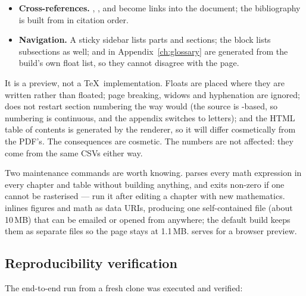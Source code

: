 \begin{itemize}
     with .
  \item \textbf{Cross-references.} ,
    ,  and
     become links into the document; the bibliography is built
    from  in citation order.
  \item \textbf{Navigation.} A sticky sidebar lists parts and sections; the
     block lists subsections as well;
     and  in
    Appendix~\ref{ch:glossary} are generated from the build's own float list, so they cannot
    disagree with the page.
\end{itemize}

\begin{remark}
  It is a preview, not a \TeX\ implementation. Floats are placed where they are written
  rather than floated; page breaking, widows and hyphenation are ignored;
   does not restart section numbering the way 
  would (the source is -based, so numbering is continuous, and the appendix
  switches to letters); and the HTML table of contents is generated by the renderer, so it
  will differ cosmetically from the PDF's. The consequences are cosmetic. The numbers are
  not affected: they come from the same CSVs either way.
\end{remark}

Two maintenance commands are worth knowing.  parses every math expression in every chapter and table without building
anything, and exits non-zero if one cannot be rasterised --- run it after editing a chapter
with new mathematics.  inlines figures and
math as data URIs, producing one self-contained file (about 10\,MB) that can be emailed or
opened from anywhere; the default build keeps them as separate files so the page stays at
1.1\,MB.  serves  for a
browser preview.

\subsection{Reproducibility verification}

The end-to-end run from a fresh clone was executed and verified:


